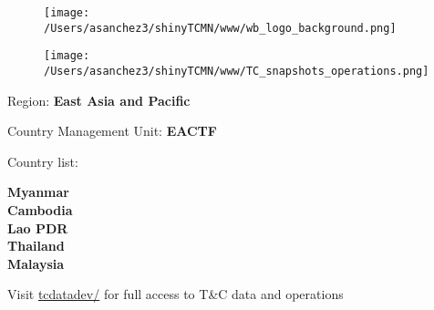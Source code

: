 \documentclass{article}\usepackage[]{graphicx}\usepackage[]{color}
\begin{document}
\begin{figure}
  \vspace{-3ex} %
  \hspace{-7ex} %
  \texttt{[image: /Users/asanchez3/shinyTCMN/www/wb\_logo\_background.png]}
\end{figure}
\begin{figure}
  \begin{minipage}[t]{0.99\textwidth} %
      \vspace{-30ex}
      \hspace{-2ex}
      \raggedright{\texttt{[image: /Users/asanchez3/shinyTCMN/www/TC\_snapshots\_operations.png]}}
  \end{minipage}
\end{figure}

\vspace{2ex}
\raggedright{\Large Region: \color{white!30!blue} \textbf{\Large East Asia and Pacific}}

\vspace{2ex}
\raggedright{\Large Country Management Unit: \color{white!30!blue} \textbf{EACTF}}

\vspace{2ex}
\raggedright{\Large Country list:}  

\vspace{2ex}

\raggedright{\textbf{\Large \color{white!30!blue}Myanmar\\
 Cambodia\\
 Lao PDR\\
 Thailand\\
 Malaysia\\
 }}

\vspace{10ex}
\raggedright{\large Visit \href{http://tcdatadev/}{\Large tcdatadev/} for full access to T\&C data and operations}

%
\end{document}
